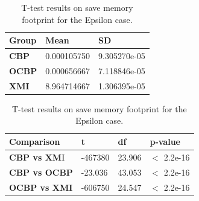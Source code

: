 \documentclass{llncs}
\begin{document}
\begin{table}[ht]
    \centering
    \label{table:ttest_save_memory_epsilon}
    \caption{T-test results on save memory footprint for the Epsilon case.}
    \begin{minipage}{0.44\textwidth}
        \centering
        \begin{tabular}{|p{}|p{}|p{}|}
            \hline 
            \textbf{Group}  & \textbf{Mean} & \textbf{SD} \\ 
            \hline 
            \textbf{CBP} & 0.000105750      &9.305270e-05 \\ 
            \hline 
            \textbf{OCBP} & 0.000656667   & 7.118846e-05 \\ 
            \hline 
            \textbf{XMI} &8.964714667   & 1.306395e-05 \\ 
            \hline 
        \end{tabular} 
    \end{minipage}
    \hfill
    \begin{minipage}{0.54\textwidth}
        \centering
        \begin{tabular}{|p{}|p{}|p{}|p{}|}
            \hline 
            \textbf{Comparison} & \textbf{t}  & \textbf{df} & \textbf{p-value} \\ 
            \hline 
            \textbf{CBP vs XM}I &-467380 &23.906& $<$ 2.2e-16 \\ 
            \hline 
            \textbf{CBP vs OCBP} &-23.036  &43.053 & $<$ 2.2e-16 \\ 
            \hline 
            \textbf{OCBP vs XMI} & -606750 &24.547  & $<$ 2.2e-16 \\ 
            \hline 
        \end{tabular} 
    \end{minipage}
\end{table}
\end{document}
